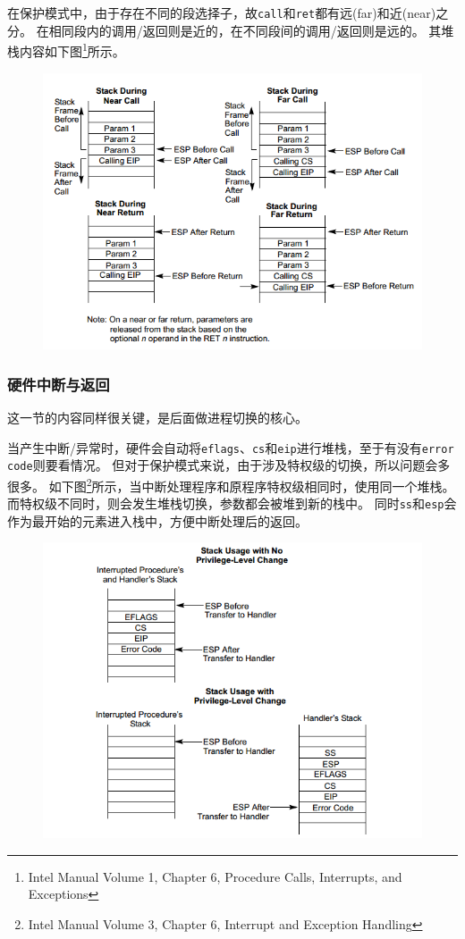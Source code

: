 \documentclass[logo,reportComp]{thesis}
\begin{document}
在保护模式中，由于存在不同的段选择子，故\verb'call'和\verb'ret'都有远(far)和近(near)之分。
在相同段内的调用/返回则是近的，在不同段间的调用/返回则是远的。
其堆栈内容如下图\footnote{Intel Manual Volume 1, Chapter 6, Procedure Calls, Interrupts, and Exceptions}所示。
\begin{figure}[H]
\centering
\includegraphics[width=0.7\linewidth]{fig/call.PNG}
\end{figure}

\subsubsection{硬件中断与返回}
这一节的内容同样很关键，是后面做进程切换的核心。

当产生中断/异常时，硬件会自动将\verb'eflags'、\verb'cs'和\verb'eip'进行堆栈，至于有没有\verb'error code'则要看情况。
但对于保护模式来说，由于涉及特权级的切换，所以问题会多很多。
如下图\footnote{Intel Manual Volume 3, Chapter 6, Interrupt and Exception Handling}所示，当中断处理程序和原程序特权级相同时，使用同一个堆栈。
而特权级不同时，则会发生堆栈切换，参数都会被堆到新的栈中。
同时\verb'ss'和\verb'esp'会作为最开始的元素进入栈中，方便中断处理后的返回。
\begin{figure}[H]
\centering
\includegraphics[width=0.7\linewidth]{fig/interrupt-stack.PNG}
\end{figure}
\end{document}
